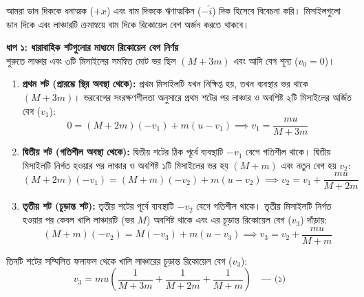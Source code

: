 \documentclass[12pt, a4paper]{article}
\begin{document}
\begin{tcolorbox}[solutionbox={সমাধান (Solution)}]
\noindent
আমরা ডান দিককে ধনাত্মক ($+x$) এবং বাম দিককে ঋণাত্মকিন ($-\hat{i}$) দিক হিসেবে বিবেচনা করি। মিসাইলগুলো ডান দিকে এবং লাঞ্চারটি ক্রমান্বয়ে বাম দিকে রিকোয়েল বেগ অর্জন করতে থাকবে।

\vspace{0.5em}
\noindent
\textbf{ধাপ ১: ধারাবাহিক শটগুলোর মাধ্যমে রিকোয়েল বেগ নির্ণয়} \\
শুরুতে লাঞ্চার এবং ৩টি মিসাইলের সমন্বিত মোট ভর ছিল $(M + 3m)$ এবং আদি বেগ শূন্য ($v_0 = 0$)।
\begin{enumerate}[leftmargin=*, parsep=0.4ex]
    \item \textbf{প্রথম শট (প্রারম্ভে স্থির অবস্থা থেকে):}
    প্রথম মিসাইলটি যখন নিক্ষিপ্ত হয়, তখন ব্যবস্থার ভর থাকে $(M + 3m)$। ভরবেগের সংরক্ষণশীলতা অনুসারে প্রথম শটের পর লাঞ্চার ও অবশিষ্ট ২টি মিসাইলের অর্জিত বেগ ($v_1$):
    \[ 0 = (M + 2m)(-v_1) + m(u - v_1) \implies v_1 = \frac{mu}{M + 3m} \]
    
    \item \textbf{দ্বিতীয় শট (গতিশীল অবস্থা থেকে):}
    দ্বিতীয় শটের ঠিক পূর্বে ব্যবস্থাটি $-v_1$ বেগে গতিশীল থাকে। দ্বিতীয় মিসাইলটি নির্গত হওয়ার পর লাঞ্চার ও অবশিষ্ট ১টি মিসাইলের ভর হয় $(M + m)$ এবং নতুন বেগ হয় $v_2$:
    \[ (M + 2m)(-v_1) = (M + m)(-v_2) + m(u - v_2) \implies v_2 = v_1 + \frac{mu}{M + 2m} \]
    
    \item \textbf{তৃতীয় শট (চূড়ান্ত শট):}
    তৃতীয় শটের পূর্বে ব্যবস্থাটি $-v_2$ বেগে গতিশীল থাকে। তৃতীয় মিসাইলটি নির্গত হওয়ার পর কেবল খালি লাঞ্চারটি (ভর $M$) অবশিষ্ট থাকে এবং এর চূড়ান্ত রিকোয়েল বেগ ($v_3$) দাঁড়ায়:
    \[ (M + m)(-v_2) = M(-v_3) + m(u - v_3) \implies v_3 = v_2 + \frac{mu}{M + m} \]
\end{enumerate}

তিনটি শটের সম্মিলিত ফলাফল থেকে খালি লাঞ্চারের চূড়ান্ত রিকোয়েল বেগ ($v_3$):
\[ v_3 = mu \left( \frac{1}{M + 3m} + \frac{1}{M + 2m} + \frac{1}{M + m} \right) \quad \text{--- (১)} \]

\vspace{1em}
\begin{center}
\begin{tikzpicture}[>=Stealth, scale=1.3, text=black]
    

\end{tikzpicture}
\end{center}
\end{tcolorbox}
\end{document}
